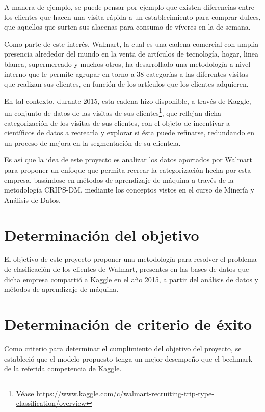 \documentclass[]{book}
\let\rmarkdownfootnote\footnote%
\def\footnote{\protect\rmarkdownfootnote}
\begin{document}
A manera de ejemplo, se puede pensar por ejemplo que existen diferencias entre los clientes que hacen una visita rápida a un establecimiento para comprar dulces, que aquellos que surten sus alacenas para consumo de víveres en la de semana.

Como parte de este interés, Walmart, la cual es una cadena comercial con amplia presencia alrededor del mundo en la venta de artículos de tecnología, hogar, linea blanca, supermercado y muchos otros, ha desarrollado una metodología a nivel interno que le permite agrupar en torno a 38 categorías a las diferentes visitas que realizan sus clientes, en función de los artículos que los clientes adquieren.

En tal contexto, durante 2015, esta cadena hizo disponible, a través de Kaggle, un conjunto de datos de las visitas de sus clientes\footnote{Véase \url{https://www.kaggle.com/c/walmart-recruiting-trip-type-classification/overview}}, que reflejan dicha categorización de los visitas de sus clientes, con el objeto de incentivar a científicos de datos a recrearla y explorar si ésta puede refinarse, redundando en un proceso de mejora en la segmentación de su clientela.

Es así que la idea de este proyecto es analizar los datos aportados por Walmart para proponer un enfoque que permita recrear la categorización hecha por esta empresa, basándose en métodos de aprendizaje de máquina a través de la metodología CRIPS-DM, mediante los conceptos vistos en el curso de Minería y Análisis de Datos.

\hypertarget{determinaciuxf3n-del-objetivo}{%
\section{Determinación del objetivo}\label{determinaciuxf3n-del-objetivo}}

El objetivo de este proyecto proponer una metodología para resolver el problema de clasificación de los clientes de Walmart, presentes en las bases de datos que dicha empresa compartió a Kaggle en el año 2015, a partir del análisis de datos y métodos de aprendizaje de máquina.

\hypertarget{determinaciuxf3n-de-criterio-de-uxe9xito}{%
\section{Determinación de criterio de éxito}\label{determinaciuxf3n-de-criterio-de-uxe9xito}}

Como criterio para determinar el cumplimiento del objetivo del proyecto, se estableció que el modelo propuesto tenga un mejor desempeño que el bechmark de la referida competencia de Kaggle.
\end{document}

